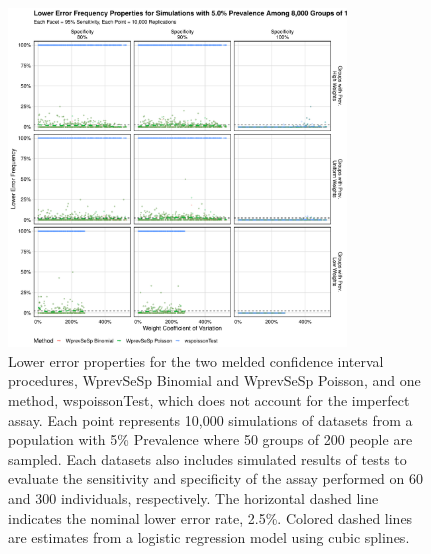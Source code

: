 \documentclass[AMA,STIX1COL]{WileyNJD-v2}
\begin{document}
\begin{figure}
\centering
\includegraphics[width=0.8\textwidth]{figures/imperfect_lower_error_frequency_8000_groups_0_05_prev.pdf}
\caption{Lower error properties for the two melded confidence interval procedures, WprevSeSp Binomial and WprevSeSp Poisson, and one method, wspoissonTest, which does not account for the imperfect assay.
Each point represents 10,000 simulations of datasets from a population with 5\% Prevalence where 50 groups of 200 people are sampled.
Each datasets also includes simulated results of tests to evaluate the sensitivity and specificity of the assay performed on 60 and 300 individuals, respectively.
The horizontal dashed line indicates the nominal lower error rate, 2.5\%.
Colored dashed lines are estimates from a logistic regression model using cubic splines.}
\label{fig:imperfect_lower_error_frequency_8000_groups_0_05_prev}
\end{figure}
\end{document}
